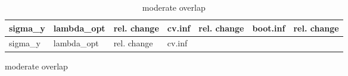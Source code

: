 \documentclass[
  letterpaper,
  DIV=11,
  numbers=noendperiod]{scrartcl}
\begin{document}
\begin{figure}
\begin{minipage}[t]{0.50\linewidth}
\end{minipage}%
\newline
\begin{minipage}[t]{0.50\linewidth}

\begin{longtable}[]{@{}
  >{\raggedleft\arraybackslash}p{}
  >{\raggedleft\arraybackslash}p{}
  >{\raggedleft\arraybackslash}p{}
  >{\raggedleft\arraybackslash}p{}
  >{\raggedleft\arraybackslash}p{}
  >{\raggedleft\arraybackslash}p{}
  >{\raggedleft\arraybackslash}p{}@{}}
\caption{moderate overlap}\tabularnewline
\toprule\noalign{}
\begin{minipage}[b]{\linewidth}\raggedleft
sigma\_y
\end{minipage} & \begin{minipage}[b]{\linewidth}\raggedleft
lambda\_opt
\end{minipage} & \begin{minipage}[b]{\linewidth}\raggedleft
rel. change
\end{minipage} & \begin{minipage}[b]{\linewidth}\raggedleft
cv.inf
\end{minipage} & \begin{minipage}[b]{\linewidth}\raggedleft
rel. change
\end{minipage} & \begin{minipage}[b]{\linewidth}\raggedleft
boot.inf
\end{minipage} & \begin{minipage}[b]{\linewidth}\raggedleft
rel. change
\end{minipage} \\
\midrule\noalign{}
\endfirsthead
\toprule\noalign{}
\begin{minipage}[b]{\linewidth}\raggedleft
sigma\_y
\end{minipage} & \begin{minipage}[b]{\linewidth}\raggedleft
lambda\_opt
\end{minipage} & \begin{minipage}[b]{\linewidth}\raggedleft
rel. change
\end{minipage} & \begin{minipage}[b]{\linewidth}\raggedleft
cv.inf
\end{minipage} & \begin{minipage}[b]{\linewidth}\raggedleft

\end{minipage}
\end{longtable}
\end{minipage}
\end{figure}
\end{document}
